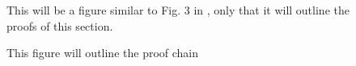 \begin{figure}
	This will be a figure similar to Fig. 3 in \cite{owhadi20}, only that it will outline the proofs of this section.
	\caption{This figure will outline the proof chain}
	\label{fig:convergence}
\end{figure}